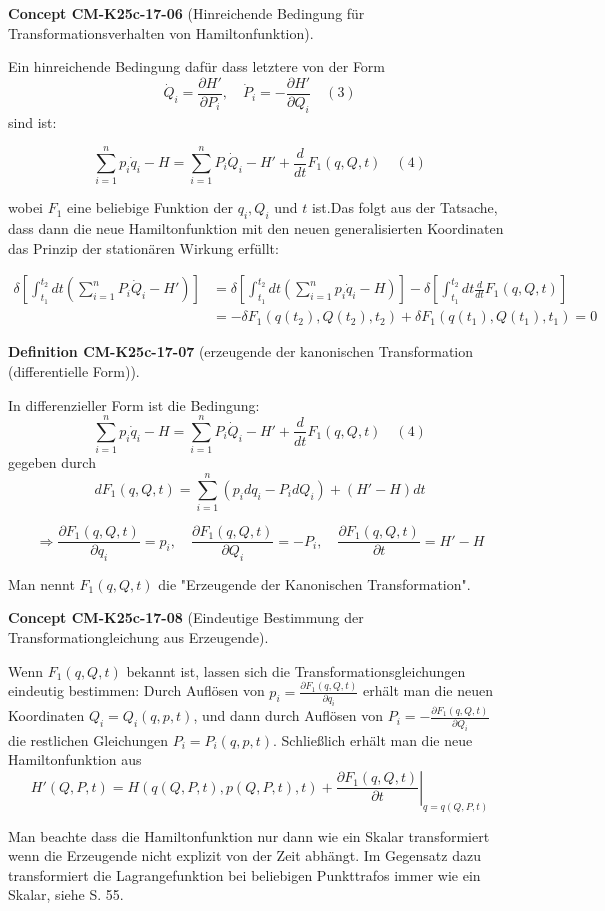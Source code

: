 \documentclass[10pt, letterpaper]{article}
\newcommand{\CustomHeading}[3]{%
  \par\medskip\noindent%
  \textbf{#1 #2} \textnormal{(#3)}.\enskip%
}
\newenvironment{DEF}[2]{\CustomHeading{Definition}{#1}{#2}}{}
\newenvironment{CONC}[2]{\CustomHeading{Concept}{#1}{#2}}{}
\begin{document}
\begin{CONC}{CM-K25c-17-06}{Hinreichende Bedingung für Transformationsverhalten von Hamiltonfunktion}
Ein hinreichende Bedingung dafür dass letztere von der Form
\[\dot{Q}_i = \frac{\partial H'}{\partial P_i}, \quad \dot{P}_i = -\frac{\partial H'}{\partial Q_i} \quad (3)\]
sind ist:

\[\sum_{i=1}^n p_i\dot{q}_i - H = \sum_{i=1}^n P_i\dot{Q}_i - H' + \frac{d}{dt}F_1(q,Q,t) \quad (4)\]

wobei $F_1$ eine beliebige Funktion der $q_i, Q_i$ und $t$ ist.Das folgt aus der Tatsache, dass dann die neue Hamiltonfunktion mit den neuen generalisierten Koordinaten das Prinzip der stationären Wirkung erfüllt:

\begin{align*}
\delta\left[\int_{t_1}^{t_2} dt\left(\sum_{i=1}^n P_i\dot{Q}_i - H'\right)\right] &= \delta\left[\int_{t_1}^{t_2} dt\left(\sum_{i=1}^n p_i\dot{q}_i-H\right)\right] - \delta\left[\int_{t_1}^{t_2} dt\frac{d}{dt}F_1(q,Q,t)\right]\\
&= -\delta F_1(q(t_2),Q(t_2),t_2) + \delta F_1(q(t_1),Q(t_1),t_1) = 0
\end{align*}
\end{CONC}

\begin{DEF}{CM-K25c-17-07}{erzeugende der kanonischen Transformation (differentielle Form)}
In differenzieller Form ist die Bedingung:
\[\sum_{i=1}^n p_i\dot{q}_i - H = \sum_{i=1}^n P_i\dot{Q}_i - H' + \frac{d}{dt}F_1(q,Q,t) \quad (4)\]
gegeben durch 
\[dF_1(q,Q,t) = \sum_{i=1}^n (p_i dq_i - P_i dQ_i) + (H'-H)dt\]

\[\Rightarrow \frac{\partial F_1(q,Q,t)}{\partial q_i} = p_i, \quad \frac{\partial F_1(q,Q,t)}{\partial Q_i} = -P_i, \quad \frac{\partial F_1(q,Q,t)}{\partial t} = H'-H\]

Man nennt $F_1(q,Q,t)$ die "Erzeugende der Kanonischen Transformation".
\end{DEF}

\begin{CONC}{CM-K25c-17-08}{Eindeutige Bestimmung der Transformationgleichung aus Erzeugende}
Wenn $F_1(q,Q,t)$ bekannt ist, lassen sich die Transformationsgleichungen eindeutig bestimmen: Durch Auflösen von $p_i = \frac{\partial F_1(q,Q,t)}{\partial q_i}$ erhält man die neuen Koordinaten $Q_i = Q_i(q,p,t)$, und dann durch Auflösen von $P_i = -\frac{\partial F_1(q,Q,t)}{\partial Q_i}$ die restlichen Gleichungen $P_i = P_i(q,p,t)$. Schließlich erhält man die neue Hamiltonfunktion aus
\[H'(Q,P,t) = H(q(Q,P,t),p(Q,P,t),t) + \left.\frac{\partial F_1(q,Q,t)}{\partial t}\right|_{q=q(Q,P,t)}\]

Man beachte dass die Hamiltonfunktion nur dann wie ein Skalar transformiert wenn die Erzeugende nicht explizit von der Zeit abhängt. Im Gegensatz dazu transformiert die Lagrangefunktion bei beliebigen Punkttrafos immer wie ein Skalar, siehe S. 55.
\end{CONC}
\end{document}
